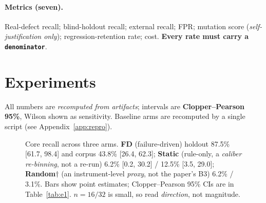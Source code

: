 \documentclass{article}
\begin{document}
\paragraph{Metrics (seven).} Real-defect recall; blind-holdout recall; external recall; FPR;
mutation score (\emph{self-justification only}); regression-retention rate; cost. \textbf{Every
rate must carry a \texttt{denominator}}.

\section{Experiments}
\label{sec:exp}
All numbers are \emph{recomputed from artifacts}; intervals are \textbf{Clopper--Pearson 95\%},
Wilson shown as sensitivity. Baseline arms are recomputed by a single script (see Appendix~\ref{app:repro}).

\begin{figure}[t]
\centering
{}
\caption{Core recall across three arms. \textbf{FD} (failure-driven) holdout
87.5\% [61.7, 98.4] and corpus 43.8\% [26.4, 62.3]; \textbf{Static} (rule-only, a
\emph{caliber re-binning}, not a re-run) 6.2\% [0.2, 30.2] / 12.5\% [3.5, 29.0];
\textbf{Random$\dagger$} (an instrument-level \emph{proxy}, not the paper's B3) 6.2\% / 3.1\%.
Bars show point estimates; Clopper--Pearson 95\% CIs are in Table~\ref{tab:e1}. $n=16/32$ is
small, so read \emph{direction}, not magnitude.}
\label{fig:core}
\end{figure}
\end{document}
